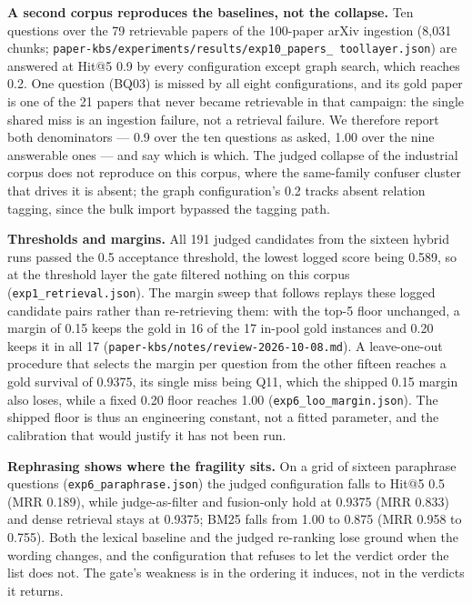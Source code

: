 \textbf{A second corpus reproduces the baselines, not the collapse.} Ten
questions over the 79 retrievable papers of the 100-paper arXiv ingestion
(8{,}031 chunks; \texttt{paper-kbs/experiments/results/exp10\_papers\_%
toollayer.json}) are answered at Hit@5 0.9 by every configuration except graph
search, which reaches 0.2. One question (BQ03) is missed by all eight
configurations, and its gold paper is one of the 21 papers that never became
retrievable in that campaign: the single shared miss is an ingestion failure,
not a retrieval failure. We therefore report both denominators --- 0.9 over
the ten questions as asked, 1.00 over the nine answerable ones --- and say
which is which. The judged collapse of the industrial corpus does not
reproduce on this corpus, where the same-family confuser cluster that drives
it is absent; the graph configuration's 0.2 tracks absent relation tagging,
since the bulk import bypassed the tagging path.

\textbf{Thresholds and margins.} All 191 judged candidates from the sixteen
hybrid runs passed the 0.5 acceptance threshold, the lowest logged score being
0.589, so at the threshold layer the gate filtered nothing on this corpus
(\texttt{exp1\_retrieval.json}). The margin sweep that follows replays these
logged candidate pairs rather than re-retrieving them: with the top-5 floor
unchanged, a margin of 0.15 keeps the gold in 16 of the 17 in-pool gold
instances and 0.20 keeps it in all 17
(\texttt{paper-kbs/notes/review-2026-10-08.md}). A leave-one-out procedure that
selects the margin per question from the other fifteen reaches a gold survival
of 0.9375, its single miss being Q11, which the shipped 0.15 margin also
loses, while a fixed 0.20 floor reaches 1.00
(\texttt{exp6\_loo\_margin.json}). The shipped floor is thus an engineering
constant, not a fitted parameter, and the calibration that would justify it
has not been run.

\textbf{Rephrasing shows where the fragility sits.} On a grid of sixteen
paraphrase questions (\texttt{exp6\_paraphrase.json}) the judged configuration
falls to Hit@5 0.5 (MRR 0.189), while judge-as-filter and fusion-only hold at
0.9375 (MRR 0.833) and dense retrieval stays at 0.9375; BM25 falls from 1.00
to 0.875 (MRR 0.958 to 0.755). Both the lexical baseline and the judged
re-ranking lose ground when the wording changes, and the configuration that
refuses to let the verdict order the list does not. The gate's weakness is in
the ordering it induces, not in the verdicts it returns.

